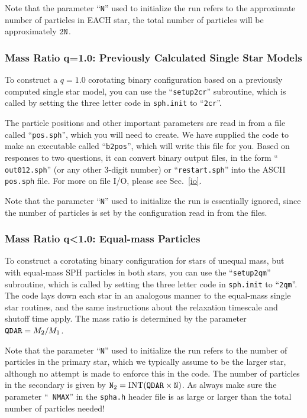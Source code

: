 Note that the parameter ``{\tt N}'' used to initialize the run refers
to the approximate number of particles in EACH star, the total number
of particles will be approximately $2{\tt N}$.

\subsubsection{Mass Ratio q=1.0: Previously Calculated Single Star Models}
\label{in:2c:er}
To construct a $q=1.0$ corotating binary configuration based on a
previously computed single star model, you can use the
``{\tt setup2cr}'' subroutine, which is called by setting the three
letter code in {\tt sph.init} to ``{\tt 2cr}''.

The particle positions and other important parameters are read in from
a file called ``{\tt pos.sph}'', which you will need to create.  We
have supplied the code to make an executable called ``{\tt b2pos}'',
which will write this file for you.  Based on responses to two
questions, it can convert binary output files, in the form ``{\tt
out012.sph}'' (or any other 3-digit number) or ``{\tt restart.sph}'' 
into the ASCII {\tt pos.sph} file.  For more on file I/O, please see
Sec.~\ref{io}.  

Note that the parameter ``{\tt N}'' used to initialize the run is
essentially ignored, since the number of particles is set by the
configuration read in from the files.

\subsubsection{Mass Ratio q\textless 1.0: Equal-mass Particles}
\label{in:2q:em}
To construct a corotating binary configuration for stars of unequal
mass, but with equal-mass SPH particles
in both stars, you can use the
``{\tt setup2qm}'' subroutine, which is called by setting the three
letter code in {\tt sph.init} to ``{\tt 2qm}''.  
The code lays down each star in an analogous manner to the equal-mass
single star routines, and the same instructions about the relaxation
timescale and shutoff time apply.  The mass ratio is determined by the
parameter ${\tt QDAR}=M_2/M_1$.

Note that the parameter ``{\tt N}'' used to initialize the run refers
to the number of particles in the primary star, which we
typically assume to be the larger star, although no attempt is made to
enforce this in the code. The number of particles in the secondary is
given by ${\tt N}_2={\rm INT}({\tt QDAR}\times{\tt N})$.
As always make sure the parameter ``{\tt
NMAX}'' in the {\tt spha.h} header file is as large or larger than the
total number of particles needed!

